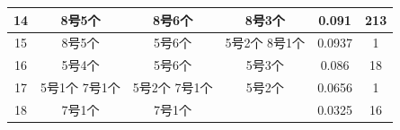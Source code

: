 \documentclass{article}
\begin{document}
\begin{table}[!h]
\begin{tabular}{|c|c|c|c|c|c|}
			14    & 8号5个      & 8号6个       & 8号3个                                                       & 0.091  & 213 \\ \hline
			15    & 8号5个      & 5号6个       & 5号2个 8号1个                                                  & 0.0937 & 1   \\ \hline
			16    & 5号4个      & 5号6个       & 5号3个                                                       & 0.086  & 18  \\ \hline
			17    & 5号1个 7号1个 & 5号2个 7号1个  & 5号2个                                                       & 0.0656 & 1   \\ \hline
			18    & 7号1个      & 7号1个       &                                                            & 0.0325 & 16  \\ \hline
		\end{tabular}
	\end{table}
	
\end{document}
